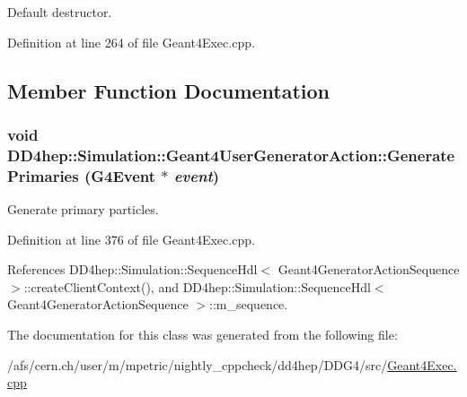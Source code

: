 Default destructor. 

Definition at line 264 of file Geant4Exec.cpp.

\subsection{Member Function Documentation}
\hypertarget{class_d_d4hep_1_1_simulation_1_1_geant4_user_generator_action_a6e5a2cb71388c8358f6fa8679ca9cf69}{
\subsubsection[{GeneratePrimaries}]{\setlength{\rightskip}{0pt plus 5cm}void DD4hep::Simulation::Geant4UserGeneratorAction::GeneratePrimaries (G4Event $\ast$ {\em event})}}
\label{class_d_d4hep_1_1_simulation_1_1_geant4_user_generator_action_a6e5a2cb71388c8358f6fa8679ca9cf69}


Generate primary particles. 

Definition at line 376 of file Geant4Exec.cpp.

References DD4hep::Simulation::SequenceHdl$<$ Geant4GeneratorActionSequence $>$::createClientContext(), and DD4hep::Simulation::SequenceHdl$<$ Geant4GeneratorActionSequence $>$::m\_\-sequence.

The documentation for this class was generated from the following file:\begin{DoxyCompactItemize}
\item 
/afs/cern.ch/user/m/mpetric/nightly\_\-cppcheck/dd4hep/DDG4/src/\hyperlink{_geant4_exec_8cpp}{Geant4Exec.cpp}\end{DoxyCompactItemize}
